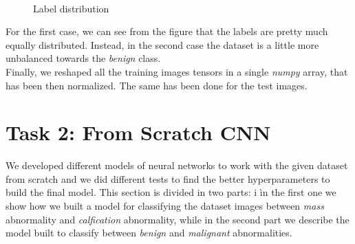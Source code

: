 \documentclass[11pt,a4paper,oneside]{article}
\begin{document}
\begin{figure}[h]
\centering
	 \quad
	 \\
\caption{Label distribution}
\label{fig:label distribution}
\end{figure}

For the first case, we can see from the figure that the labels are pretty much equally distributed. Instead, in the second case the dataset is a little more unbalanced towards the \textit{benign} class. \\
Finally, we reshaped all the training images tensors in a single \textit{numpy} array, that has been then normalized. The same has been done for the test images. 


\section{Task 2: From Scratch CNN}
We developed different models of neural networks to work with the given dataset from scratch and we did different tests to find the better hyperparameters to build the final model. This section is divided in two parts: i ìn the first one we show how we built a model for classifying the dataset images between \textit{mass} abnormality and \textit{calfication} abnormality, while in the second part we describe the model built to classify between \textit{benign} and \textit{malignant} abnormalities.
\end{document}
